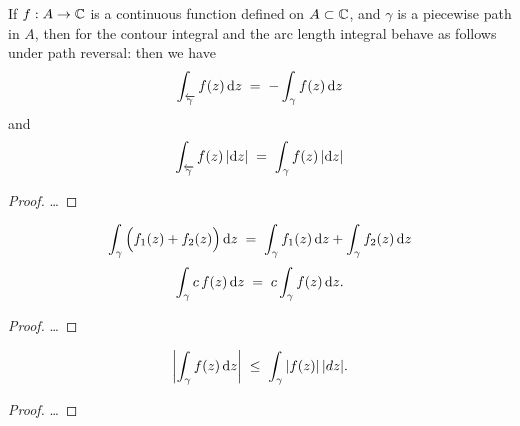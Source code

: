 \begin{lemma}
  \label{lem:integral_reversal}
  If $f : A \to \mathbb{C}$ is a continuous function defined on $A \subset \mathbb{C}$,
  and $\gamma$ is a piecewise path in $A$, then for the contour integral
  and the arc length integral behave as follows under path reversal:
  then we have
  \begin{align*}
    \int_{\overleftarrow{\gamma}} f(z) \, \mathrm{d} z \; = \; - \int_{\gamma} f(z) \, \mathrm{d} z
  \end{align*}
  and
  \begin{align*}
    \int_{\overleftarrow{\gamma}} f(z) \, |\mathrm{d} z| \; = \; \int_{\gamma} f(z) \, |\mathrm{d} z|
  \end{align*}
\end{lemma}
\begin{proof}
  \ldots
\end{proof}

\begin{lemma}
  \label{lem:integral_linearity}
  \begin{align*}
    \int_\gamma \Big( f_1(z) + f_2(z) \Big) \, \mathrm{d} z
    \; = \; \int_\gamma f_1(z) \, \mathrm{d} z + \int_\gamma f_2(z) \, \mathrm{d} z
  \end{align*}
  \begin{align*}
    \int_\gamma c \, f(z) \, \mathrm{d} z \; = \; c \int_\gamma f(z) \, \mathrm{d} z .
  \end{align*}
\end{lemma}
\begin{proof}
  \ldots
\end{proof}

\begin{lemma}
  \label{lem:integral_triangle_inequality}
  \begin{align*}
    \left| \int_\gamma f(z) \, \mathrm{d} z \right| \; \le \; \int_\gamma |f(z)| \, |dz| .
  \end{align*}
\end{lemma}
\begin{proof}
  \ldots
\end{proof}



